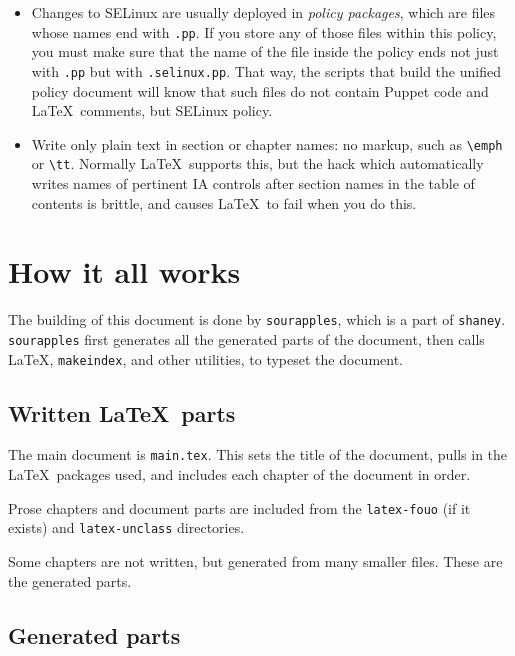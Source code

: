 \begin{itemize}
\item {} Changes to SELinux are usually deployed in
\emph{policy packages}, which are files whose names end with \verb!.pp!.
If you store any of those files within this policy, you must make sure
that the name of the file inside the policy ends not just with \verb!.pp!
but with \verb!.selinux.pp!. That way, the scripts that build the unified
policy document will know that such files do not contain Puppet code and
\LaTeX\ comments, but SELinux policy.

\item Write only plain text in section or chapter names: no markup,
  such as \verb!\emph! or \verb!\tt!. Normally \LaTeX\ supports this,
  but the hack which automatically writes names of pertinent IA
  controls after section names in the table of contents is brittle,
  and causes \LaTeX\ to fail when you do this.

\end{itemize}




\section{How it all works}
\label{workings}

The building of this document is done by \verb!sourapples!, which is a
part of \verb!shaney!. \verb!sourapples! first generates all the generated
parts of the document, then calls \LaTeX , \verb!makeindex!, and other
utilities, to typeset the document.


\subsection{Written \LaTeX\ parts}

The main document is \verb!main.tex!. This sets the title of the document,
pulls in the \LaTeX\ packages used, and includes each chapter of the
document in order.

Prose chapters and document parts are included from the \verb!latex-fouo!
(if it exists) and \verb!latex-unclass! directories.

Some chapters are not written, but generated from many smaller files.
These are the generated parts.

\subsection{Generated parts}
\label{workings:generated}

